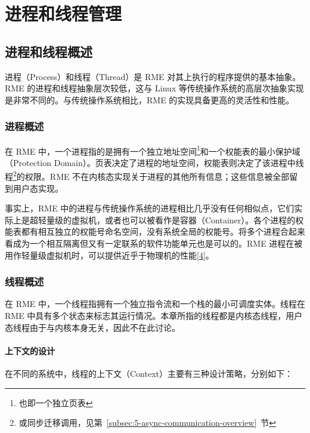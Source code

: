 \chapter{进程和线程管理}\label{ch:process-and-thread-management}

\section{进程和线程概述}\label{sec:4-process-and-thread-overview}

进程（Process）和线程（Thread）是 RME 对其上执行的程序提供的基本抽象。RME 的进程和线程抽象层次较低，这与 Linux 等传统操作系统的高层次抽象实现是非常不同的。与传统操作系统相比，RME 的实现具备更高的灵活性和性能。

\subsection{进程概述}\label{subsec:4-process-overview}

在 RME 中，一个进程指的是拥有一个独立地址空间\footnote{也即一个独立页表}和一个权能表的最小保护域（Protection
Domain）。页表决定了进程的地址空间，权能表则决定了该进程中线程\footnote{或同步迁移调用，见第~\ref{subsec:5-async-communication-overview}~节}的权限。RME 不在内核态实现关于进程的其他所有信息；这些信息被全部留到用户态实现。

事实上，RME 中的进程与传统操作系统的进程相比几乎没有任何相似点，它们实际上是超轻量级的虚拟机，或者也可以被看作是容器（Container）。各个进程的权能表都有相互独立的权能号命名空间，没有系统全局的权能号。将多个进程合起来看成为一个相互隔离但又有一定联系的软件功能单元也是可以的。RME 进程在被用作轻量级虚拟机时，可以提供近乎于物理机的性能\hyperref[cite:4-4]{{[}4{]}}。

\subsection{线程概述}\label{subsec:4-thread-overview}

在 RME 中，一个线程指拥有一个独立指令流和一个栈的最小可调度实体。线程在 RME 中具有多个状态来标志其运行情况。本章所指的线程都是内核态线程，用户态线程由于与内核本身无关，因此不在此讨论。

\subsubsection{上下文的设计}\label{subsubsec:4-context-design}

在不同的系统中，线程的上下文（Context）主要有三种设计策略，分别如下：

